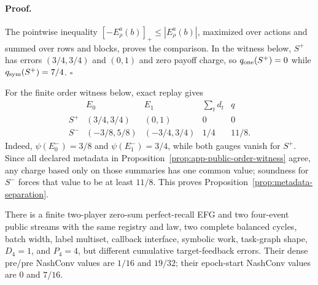 \paragraph{Proof.}
The pointwise inequality $[-E_\rho^a(b)]_+\le|E_\rho^a(b)|$, maximized over
actions and summed over rows and blocks, proves the comparison.  In the
witness below, $S^+$ has errors $(3/4,3/4)$ and $(0,1)$ and zero payoff charge,
so $q_{\rm one}(S^+)=0$ while $q_{\rm sym}(S^+)=7/4$. \hfill$\square$

For the finite order witness below, exact replay gives
\begin{equation}
\begin{array}{c|cc|c|c}
 & E_0 & E_1 & \sum_td_t & q \\
\hline
S^+ & (3/4,3/4) & (0,1) & 0 & 0 \\
S^- & (-3/8,5/8) & (-3/4,3/4) & 1/4 & 11/8.
\end{array}
\label{eq:app-charge-witness}
\end{equation}
Indeed, $\psi(E_0^-)=3/8$ and $\psi(E_1^-)=3/4$, while both gauges vanish for
$S^+$.  Since all declared metadata in
Proposition~\ref{prop:app-public-order-witness} agree, any charge based only on
those summaries has one common value; soundness for $S^-$ forces that value to
be at least $11/8$.  This proves
Proposition~\ref{prop:metadata-separation}.

\begin{proposition}
\label{prop:app-public-order-witness}
There is a finite two-player zero-sum perfect-recall EFG and two four-event
public streams with the same registry and law, two complete balanced cycles,
batch width, label multiset, callback interface, symbolic work, task-graph shape,
$D_4=1$, and $P_4=4$, but different cumulative target-feedback errors.  Their
dense pre/pre NashConv values are $1/16$ and $19/32$; their epoch-start
NashConv values are $0$ and $7/16$.
\end{proposition}


